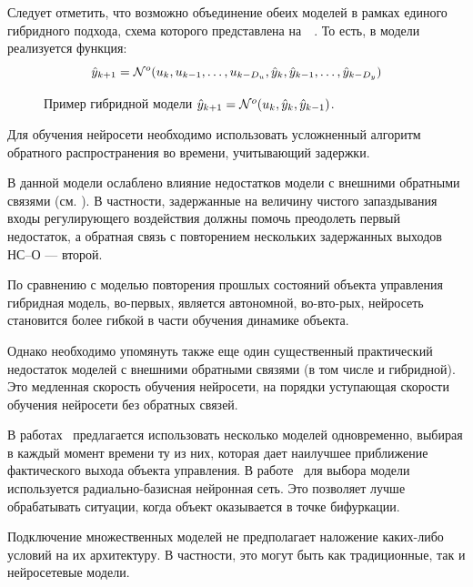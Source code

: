 Следует отметить, что возможно объединение обеих моделей в рамках
единого гибридного подхода, схема которого представлена
на~~\cite{park96}.  То есть, в модели
реализуется функция:
\begin{equation}\label{eq:nnp-hybrid}
  \hat{y}_{k+1}=\NN^o(u_k, u_{k-1},\ldots,u_{k-D_u}, \hat{y}_k,
                              \hat{y}_{k-1},\ldots, \hat{y}_{k-D_y})
\end{equation}

\begin{figure}[h]
  \centering
  
  \caption{Пример гибридной модели
  $\hat{y}_{k+1}=\mathcal{N}^o(u_k, \hat{y}_k, \hat{y}_{k-1})$.}
  \label{fig:nnp-hybrid}
\end{figure}

Для обучения нейросети необходимо использовать усложненный алгоритм
обратного распространения во времени, учитывающий задержки.

В данной модели ослаблено влияние недостатков модели с внешними
обратными связями (см. ).  В частности,
задержанные на величину чистого запаздывания входы регулирующего
воздействия должны помочь преодолеть первый недостаток, а обратная
связь с повторением нескольких задержанных выходов НС--О --- второй.

По сравнению с моделью повторения прошлых состояний объекта управления
гибридная модель, во-первых, является автономной, во-{вто-рых}, нейросеть
становится более гибкой в части обучения динамике объекта.

Однако необходимо упомянуть также еще один существенный практический
недостаток моделей с внешними обратными связями (в том числе и
гибридной).  Это медленная скорость обучения нейросети, на порядки
уступающая скорости обучения нейросети без обратных связей.


В работах~\cite{narmuk96,ronco98} предлагается использовать
несколько моделей одновременно, выбирая в каждый момент времени ту из
них, которая дает наилучшее приближение фактического выхода объекта
управления.  В работе~\cite{ronco98} для выбора модели используется
радиально-базисная нейронная сеть.  Это позволяет лучше обрабатывать
ситуации, когда объект оказывается в точке бифуркации.

Подключение множественных моделей не предполагает наложение каких-либо
условий на их архитектуру.  В частности, это могут быть как
традиционные, так и нейросетевые модели.

